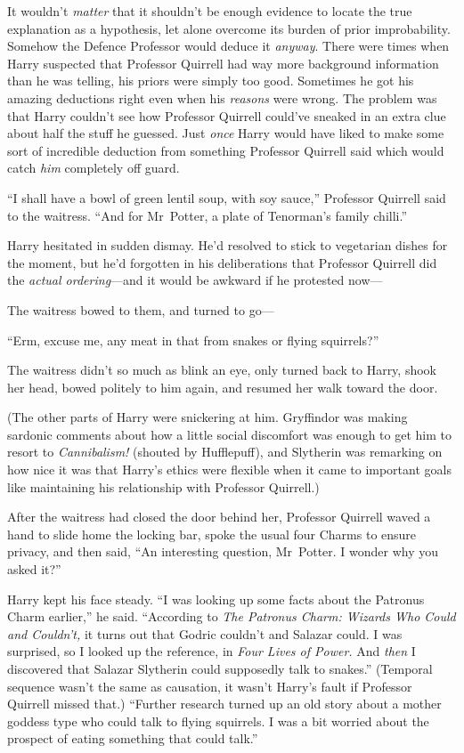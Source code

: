 It wouldn’t \emph{matter} that it shouldn’t be enough evidence to locate the true explanation as a hypothesis, let alone overcome its burden of prior improbability. Somehow the Defence Professor would deduce it \emph{anyway}. There were times when Harry suspected that Professor Quirrell had way more background information than he was telling, his priors were simply too good. Sometimes he got his amazing deductions right even when his \emph{reasons} were wrong. The problem was that Harry couldn’t see how Professor Quirrell could’ve sneaked in an extra clue about half the stuff he guessed. Just \emph{once} Harry would have liked to make some sort of incredible deduction from something Professor Quirrell said which would catch \emph{him} completely off guard.

\later

“I shall have a bowl of green lentil soup, with soy sauce,” Professor Quirrell said to the waitress. “And for Mr~Potter, a plate of Tenorman’s family chilli.”

Harry hesitated in sudden dismay. He’d resolved to stick to vegetarian dishes for the moment, but he’d forgotten in his deliberations that Professor Quirrell did the \emph{actual ordering}—and it would be awkward if he protested now—

The waitress bowed to them, and turned to go—

“Erm, excuse me, any meat in that from snakes or flying squirrels?”

The waitress didn’t so much as blink an eye, only turned back to Harry, shook her head, bowed politely to him again, and resumed her walk toward the door.

(The other parts of Harry were snickering at him. Gryffindor was making sardonic comments about how a little social discomfort was enough to get him to resort to \emph{Cannibalism!} (shouted by Hufflepuff), and Slytherin was remarking on how nice it was that Harry’s ethics were flexible when it came to important goals like maintaining his relationship with Professor Quirrell.)

After the waitress had closed the door behind her, Professor Quirrell waved a hand to slide home the locking bar, spoke the usual four Charms to ensure privacy, and then said, “An interesting question, Mr~Potter. I wonder why you asked it?”

Harry kept his face steady. “I was looking up some facts about the Patronus Charm earlier,” he said. “According to \emph{The Patronus Charm: Wizards Who Could and Couldn’t,} it turns out that Godric couldn’t and Salazar could. I was surprised, so I looked up the reference, in \emph{Four Lives of Power.} And \emph{then} I discovered that Salazar Slytherin could supposedly talk to snakes.” (Temporal sequence wasn’t the same as causation, it wasn’t Harry’s fault if Professor Quirrell missed that.) “Further research turned up an old story about a mother goddess type who could talk to flying squirrels. I was a bit worried about the prospect of eating something that could talk.”


